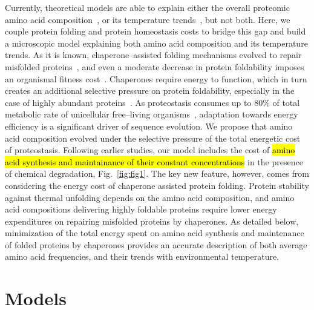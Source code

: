 \documentclass[10pt,letterpaper]{article}
\begin{document}
Currently, theoretical models are able to explain either the overall proteomic amino acid composition~\cite{Seligmann2003CostMinimization,Heizer2011Amino,Krick2014Amino}, or its temperature trends~\cite{Berezovsky2007Positive,Venev2015Massively}, but not both. Here, we couple protein folding and protein homeostasis costs to bridge this gap and build a microscopic model explaining both amino acid composition and its temperature trends. As it is known, chaperone--assisted folding mechanisms evolved to repair misfolded proteins~\cite{Hartl2011Molecular}, and even a moderate decrease in protein foldability imposes an organismal fitness cost~\cite{Drummond2008MistranslationInduced,Samerotte2011Misfolded}. Chaperones require energy to function, which in turn creates an additional selective pressure on protein foldability, especially in the case of highly abundant proteins~\cite{Kepp2014Model}. As proteostasis consumes up to 80\% of total metabolic rate of unicellular free--living organisms~\cite{Kepp2014Model}, adaptation towards energy efficiency is a significant driver of sequence evolution. We propose that amino acid composition evolved under the selective pressure of the total energetic cost of proteostasis. Following earlier studies, our model includes the cost of \hl{amino acid synthesis and maintainance of their constant concentrations} in the presence of chemical degradation, Fig.~\ref{fig:fig1}. The key new feature, however, comes from considering the energy cost of chaperone assisted protein folding. Protein stability against thermal unfolding depends on the amino acid composition, and amino acid compositions delivering highly foldable proteins require lower energy expenditures on repairing misfolded proteins by chaperones. As detailed below, minimization of the total energy spent on amino acid synthesis and maintenance of folded proteins by chaperones provides an accurate description of both average amino acid frequencies, and their trends with environmental temperature.

\section*{Models}
\end{document}
